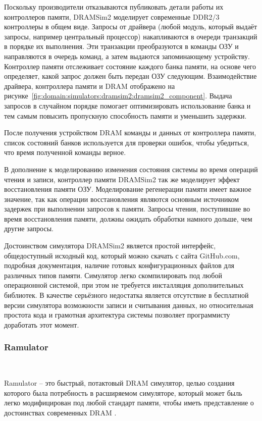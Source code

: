 Поскольку производители отказываются публиковать детали работы их контроллеров памяти, DRAMSim2 моделирует современные DDR2/3 контроллеры в общем виде. Запросы от драйвера (любой модуль, который выдаёт запросы, например центральный процессор) накапливаются в очереди транзакций в порядке их выполнения.  Эти транзакции преобразуются в команды ОЗУ и направляются в очередь команд, а затем выдаются запоминающему устройству. Контроллер памяти отслеживает состояние каждого банка памяти, на основе чего определяет, какой запрос должен быть передан ОЗУ следующим. Взаимодействие драйвера, контроллера памяти и DRAM отображено на рисунке~\ref{fig:domain:simulators:dramsim2:dramsim2_component}. Выдача запросов в случайном порядке помогает оптимизировать использование банка и тем самым повысить пропускную способность памяти и уменьшить задержки.

После получения устройством DRAM команды и данных от контроллера памяти, список состояний банков используется для проверки ошибок, чтобы убедиться, что время полученной команды верное. 

В дополнение к моделированию изменения состояния системы во время операций чтения и записи, контроллер памяти DRAMSim2 так же моделирует эффект восстановления памяти ОЗУ. Моделирование регенерации памяти имеет важное значение, так как операции восстановления являются основным источником задержек при выполнении запросов к памяти. Запросы чтения, поступившие во время восстановления памяти, должны ожидать обработки намного дольше, чем другие запросы. 

Достоинством симулятора DRAMSim2 является простой интерфейс, общедоступный исходный код, который можно скачать с сайта GitHub.com, подробная документация, наличие готовых конфигурационных файлов для различных типов памяти. Симулятор легко скомпилировать под любой операционной системой, при этом не требуется инсталляция дополнительных библиотек.  В качестве серьёзного недостатка является отсутствие в бесплатной версии симулятора возможности записи и считывания данных, но относительная простота кода и грамотная архитектура системы позволяет программисту доработать этот момент.  

\subsubsection{Ramulator}~\\
\label{sub:domain:simulators:ramulator}

Ramulator – это быстрый, потактовый DRAM симулятор, целью создания которого была потребность в расширяемом симуляторе, который может быль легко модифицирован под любой стандарт памяти, чтобы иметь представление о достоинствах современных DRAM \cite{ramulator_manual}.

